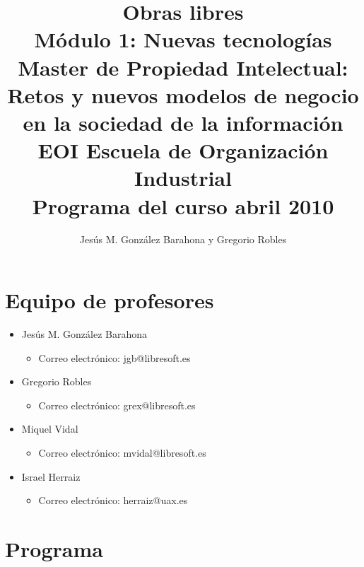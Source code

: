 \documentclass[a4paper,12pt]{article}
\title{Obras libres \\
Módulo 1: Nuevas tecnologías \\
Master de Propiedad Intelectual: \\
Retos y nuevos modelos de negocio en la sociedad de la información \\
EOI Escuela de Organización Industrial \\
Programa del curso abril 2010}
\author{Jesús M. González Barahona y Gregorio Robles}
\begin{document}
\maketitle

\newpage

\tableofcontents

\newpage

\section{Equipo de profesores}

\begin{itemize}
\item Jesús M. González Barahona
  \begin{itemize}
  \item Correo electrónico: jgb@libresoft.es
  \end{itemize}
\item Gregorio Robles
  \begin{itemize}
  \item Correo electrónico: grex@libresoft.es
  \end{itemize}
\item Miquel Vidal
  \begin{itemize}
  \item Correo electrónico: mvidal@libresoft.es
  \end{itemize}
\item Israel Herraiz
  \begin{itemize}
  \item Correo electrónico: herraiz@uax.es
  \end{itemize}
\end{itemize}





\section{Programa}
\end{document}
